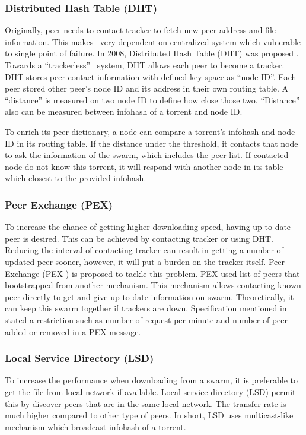 \subsubsection{Distributed Hash Table (DHT)}
Originally, peer needs to contact tracker to fetch new peer address and file information. This makes \bt~very dependent on centralized system which vulnerable to single point of failure. In 2008, Distributed Hash Table (DHT) was proposed \cite{2008:dht:loewenstern}. Towards a ``trackerless'' \bt~system, DHT allows each peer to become a tracker. DHT stores peer contact information with defined key-space as ``node ID''. Each peer stored other peer's node ID and its address in their own routing table. A ``distance'' is measured on two node ID to define how close those two. ``Distance'' also can be measured between infohash of a torrent and node ID.
	
To enrich its peer dictionary, a node can compare a torrent's infohash and node ID in its routing table. If the distance under the threshold, it contacts that node to ask the information of the swarm, which includes the peer list. If contacted node do not know this torrent, it will respond with another node in its table which closest to the provided infohash. 

\subsubsection{Peer Exchange (PEX)}
To increase the chance of getting higher downloading speed, having up to date peer is desired. This can be achieved by contacting tracker or using DHT. Reducing the interval of contacting tracker can result in getting a number of updated peer sooner, however, it will put a burden on the tracker itself. Peer Exchange (PEX )\cite{2015:PEX:the8472} is proposed to tackle this problem. PEX used list of peers that bootstrapped from another mechanism. This mechanism allows contacting known peer directly to get and give up-to-date information on swarm. Theoretically, it can keep this swarm together if trackers are down. Specification mentioned in \cite{2015:PEX:the8472} stated a restriction such as number of request per minute and number of peer added or removed in a PEX message.
	
\subsubsection{Local Service Directory (LSD)}
To increase the performance when downloading from a swarm, it is preferable to get the file from local network if available. Local service directory (LSD) permit this by discover peers that are in the same local network. The transfer rate is much higher compared to other type of peers. In short, LSD uses multicast-like mechanism which broadcast infohash of a torrent.
%

